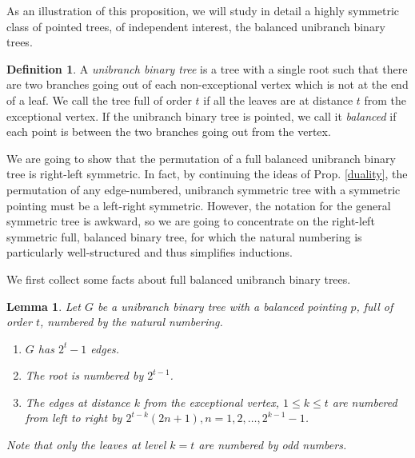 \documentclass[11pt,english]{article}
\numberwithin{figure}{section}
\numberwithin{equation}{section}
\numberwithin{table}{section}
\newtheorem{lem}{Lemma}[section]
\theoremstyle{definition}
\newtheorem{defn}{Definition}[section]
\theoremstyle{remark}
\begin{document}
As an illustration of this proposition, we will study in detail a highly symmetric
class of pointed trees, of independent interest, the balanced unibranch binary trees.

\begin{defn} A \textit{unibranch binary tree} is a tree with a single root such that there are two branches going out of each non-exceptional vertex which is not at the end of a leaf. We call the tree full of order $t$ if all the leaves are at distance $t$ from the exceptional vertex.  If the unibranch binary tree is pointed, we call it \textit{balanced} if each point is between the two branches going out from the vertex.  
\end{defn}
We are going to show that the permutation of a full balanced unibranch binary tree is right-left symmetric.  In fact, by continuing the ideas of Prop. \ref{duality}, the permutation of any edge-numbered, unibranch symmetric tree with a symmetric pointing must be a left-right symmetric.  However, the notation for the general symmetric tree is awkward, so we are going to concentrate on the right-left symmetric full, balanced binary tree, for which the natural numbering is particularly well-structured and thus simplifies inductions.

We first collect some facts about full balanced unibranch binary trees.

\begin{lem}
	Let $G$ be a unibranch binary tree with a balanced pointing $p$, full of order $t$, numbered by the natural numbering.
	\begin{enumerate}
		\item $G$  has $2^t-1$ edges.
		\item The root is numbered by $2^{t-1}$.
		\item The edges at distance $k$ from the exceptional vertex, $1 \leq k \leq t$
		are numbered from left to right by $2^{t-k}(2n+1), n=1,2,\dots, 2^{k-1}-1$.
	\end{enumerate}
	Note that only the leaves at level $k=t$ are numbered by odd numbers.
\end{lem}
\end{document}
